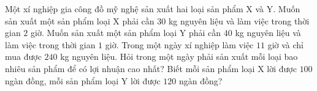 \begin{bt}%
	Một xí nghiệp gia công đồ mỹ nghệ sản xuất hai loại sản phẩm X và Y. Muốn sản xuất một sản phẩm loại X phải cần $30$ kg nguyên liệu và làm việc trong thời gian $ 2 $ giờ. Muốn sản xuất một sản phẩm loại Y phải cần $40$ kg nguyên liệu và làm việc trong thời gian $ 1 $ giờ. Trong một ngày xí nghiệp làm việc $ 11 $ giờ và chỉ mua được $240$ kg nguyên liệu. Hỏi trong một ngày phải sản xuất mỗi loại bao nhiêu sản phẩm để có lợi nhuận cao nhất? Biết mỗi sản phẩm loại X lời được $ 100 $ ngàn đồng, mỗi sản phẩm loại Y lời được $ 120 $ ngàn đồng?
\end{bt}
